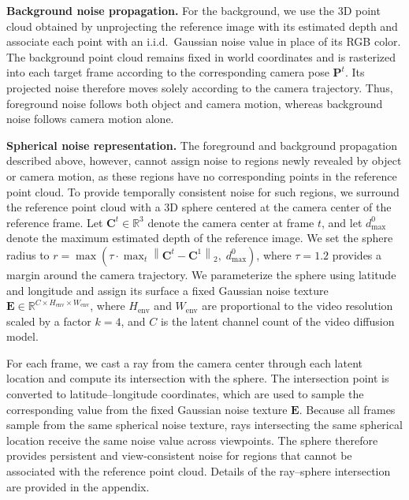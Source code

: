 \ifdefined\arxivbuild\else\documentclass{article}\fi %
\begin{document}
\noindent\textbf{Background noise propagation.}
For the background, we use the 3D point cloud obtained by unprojecting the reference image with its estimated depth and associate each point with an i.i.d.\ Gaussian noise value in place of its RGB color. The background point cloud remains fixed in world coordinates and is rasterized into each target frame according to the corresponding camera pose $\mathbf{P}^t$. Its projected noise therefore moves solely according to the camera trajectory. Thus, foreground noise follows both object and camera motion, whereas background noise follows camera motion alone.

\noindent\textbf{Spherical noise representation.}
The foreground and background propagation described above, however, cannot assign noise to regions newly revealed by object or camera motion, as these regions have no corresponding points in the reference point cloud. To provide temporally consistent noise for such regions, we surround the reference point cloud with a 3D sphere centered at the camera center of the reference frame. Let $\mathbf{C}^t\in\mathbb{R}^3$ denote the camera center at frame $t$, and let $d_{\max}^{0}$ denote the maximum estimated depth of the reference image. We set the sphere radius to $
r = \max\!\left( \tau \cdot \max_{t}\left\|\mathbf{C}^t-\mathbf{C}^1\right\|_2,\; d^{0}_{\max}\right)$, where $\tau=1.2$ provides a margin around the camera trajectory. We parameterize the sphere using latitude and longitude and assign its surface a fixed Gaussian noise texture $\mathbf{E}\in\mathbb{R}^{C\times H_{\mathrm{env}}\times W_{\mathrm{env}}}$, where $H_{\text{env}}$ and $W_{\text{env}}$ are proportional to the video resolution scaled by a factor $k=4$, and $C$ is the latent channel count of the video diffusion model.




For each frame, we cast a ray from the camera center through each latent location and compute its intersection with the sphere. The intersection point is converted to latitude–longitude coordinates, which are used to sample the corresponding value from the fixed Gaussian noise texture $\mathbf{E}$. Because all frames sample from the same spherical noise texture, rays intersecting the same spherical location receive the same noise value across viewpoints. The sphere therefore provides persistent and view-consistent noise for regions that cannot be associated with the reference point cloud. Details of the ray–sphere intersection are provided in the appendix.
\end{document}
